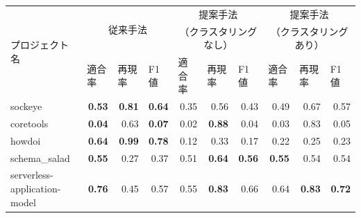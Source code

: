 \documentclass[submit,noauthor,ses,dvipdfmx]{ipsj}
\begin{document}
\begin{table}[t]
{\begin{tabular}{l||p{4em}|p{4em}|p{4em}||p{4em}|p{4em}|p{4em}||p{4em}|p{4em}|p{4em}}
            \hline
            \multirow{3}{*}{プロジェクト名}&\multicolumn{3}{c||}{\multirow{2}{*}{従来手法}} & \multicolumn{3}{c||}{提案手法} & \multicolumn{3}{c}{提案手法}\\
            &\multicolumn{3}{c||}{} & \multicolumn{3}{c||}{（クラスタリングなし）} & \multicolumn{3}{c}{（クラスタリングあり）}\\ \cline{2-10}
            & 適合率 & 再現率 & F1値 & 適合率 & 再現率 & F1値 & 適合率 & 再現率 & F1値 \\ \hline
            sockeye & \multicolumn{1}{r|}{\textbf{0.53}} & \multicolumn{1}{r|}{\textbf{0.81}} & \multicolumn{1}{r||}{\textbf{0.64}} & \multicolumn{1}{r|}{0.35} & \multicolumn{1}{r|}{0.56} & \multicolumn{1}{r||}{0.43} & \multicolumn{1}{r|}{0.49} & \multicolumn{1}{r|}{0.67} & \multicolumn{1}{r}{0.57} \\
            coretools & \multicolumn{1}{r|}{\textbf{0.04}} & \multicolumn{1}{r|}{0.63} & \multicolumn{1}{r||}{\textbf{0.07}} & \multicolumn{1}{r|}{0.02} & \multicolumn{1}{r|}{\textbf{0.88}} & \multicolumn{1}{r||}{0.04} & \multicolumn{1}{r|}{0.03} & \multicolumn{1}{r|}{0.83} & \multicolumn{1}{r}{0.05} \\
            howdoi & \multicolumn{1}{r|}{\textbf{0.64}} & \multicolumn{1}{r|}{\textbf{0.99}} & \multicolumn{1}{r||}{\textbf{0.78}} & \multicolumn{1}{r|}{0.12} & \multicolumn{1}{r|}{0.33} & \multicolumn{1}{r||}{0.17} & \multicolumn{1}{r|}{0.22} & \multicolumn{1}{r|}{0.25} & \multicolumn{1}{r}{0.23} \\
            schema\_salad & \multicolumn{1}{r|}{\textbf{0.55}} & \multicolumn{1}{r|}{0.27} & \multicolumn{1}{r||}{0.37} & \multicolumn{1}{r|}{0.51} & \multicolumn{1}{r|}{\textbf{0.64}} & \multicolumn{1}{r||}{\textbf{0.56}} & \multicolumn{1}{r|}{\textbf{0.55}} & \multicolumn{1}{r|}{0.54} & \multicolumn{1}{r}{0.54} \\
            serverless-application-model & \multicolumn{1}{r|}{\textbf{0.76}} & \multicolumn{1}{r|}{0.45} & \multicolumn{1}{r||}{0.57} & \multicolumn{1}{r|}{0.55} & \multicolumn{1}{r|}{\textbf{0.83}} & \multicolumn{1}{r||}{0.66} & \multicolumn{1}{r|}{0.64} & \multicolumn{1}{r|}{\textbf{0.83}} & \multicolumn{1}{r}{\textbf{0.72}} \\
            \hline 

\end{tabular}}
\end{table}
\end{document}
